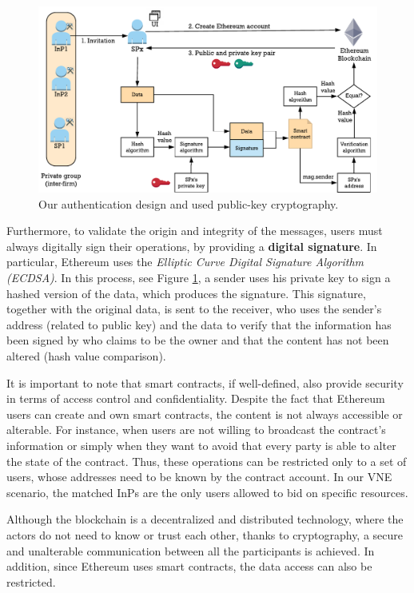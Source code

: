 \begin{figure}[bth]
	\centering
	\includegraphics[scale=0.8]{gfx/authentication_design}    
  	\caption{Our authentication design and used public-key cryptography.}
  	\label{fig:authenticationDesign}
\end{figure}

Furthermore, to validate the origin and integrity of the messages, users must always digitally sign their operations, by providing a \textbf{digital signature}. In particular, Ethereum uses the \textit{Elliptic Curve Digital Signature Algorithm \citep{johnson2001elliptic} (ECDSA)}. In this process, see Figure \ref{fig:authenticationDesign}, a sender uses his private key to sign a hashed version of the data, which produces the signature. This signature, together with the original data, is sent to the receiver, who uses the sender's address (related to public key) and the data to verify that the information has been signed by who claims to be the owner and that the content has not been altered (hash value comparison).

It is important to note that smart contracts, if well-defined, also provide security in terms of access control and confidentiality. Despite the fact that Ethereum users can create and own smart contracts, the content is not always accessible or alterable. For instance, when users are not willing to broadcast the contract's information or simply when they want to avoid that every party is able to alter the state of the contract. Thus, these operations can be restricted only to a set of users, whose addresses need to be known by the contract account. In our VNE scenario, the matched InPs are the only users allowed to bid on specific resources.

Although the blockchain is a decentralized and distributed technology, where the actors do not need to know or trust each other, thanks to cryptography, a secure and unalterable communication between all the participants is achieved. In addition, since Ethereum uses smart contracts, the data access can also be restricted.

